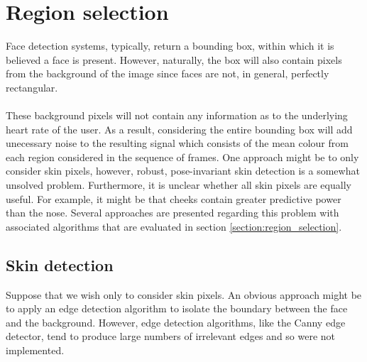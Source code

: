 \section{Region selection}
\label{ref:region_selection_impl}
Face detection systems, typically, return a bounding box, within which it is believed
a face is present. However, naturally, the box will also contain pixels from the background of 
the image since faces are not, in general, perfectly rectangular.  \\ \\
These background pixels will not contain any information as to the underlying heart rate of the user.
As a result, considering the entire bounding box will add unecessary noise to the resulting signal which consists of the mean colour from each region considered in the sequence of frames.
One approach might be to only consider skin pixels, however, robust, pose-invariant skin detection is a somewhat unsolved problem.
Furthermore, it is unclear whether all skin pixels are equally useful. For example, it might be that cheeks contain greater predictive power than the nose. Several approaches are presented regarding this problem with associated algorithms that are evaluated in section \ref{section:region_selection}.
\subsection{Skin detection}
Suppose that we wish only to consider skin pixels. An obvious approach might be to apply an edge detection algorithm to isolate the boundary between the face and the background. However, edge detection algorithms, like the Canny edge detector, tend to produce large numbers of irrelevant edges and so were not implemented.

